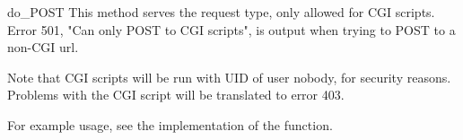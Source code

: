 \begin{methoddesc}{do_POST}{}
This method serves the  request type, only allowed for
CGI scripts.  Error 501, "Can only POST to CGI scripts", is output
when trying to POST to a non-CGI url.
\end{methoddesc}

Note that CGI scripts will be run with UID of user nobody, for security
reasons. Problems with the CGI script will be translated to error 403.

For example usage, see the implementation of the 
function.


\begin{seealso}
\end{seealso}
